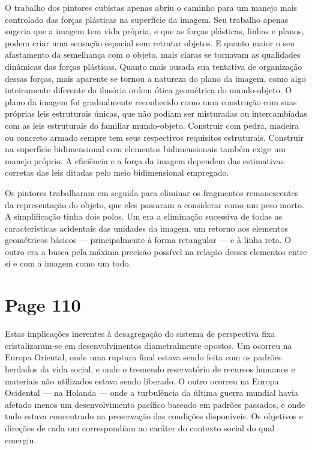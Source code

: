 \documentclass[a4paper]{article}
\begin{document}
\par

O trabalho dos pintores cubistas apenas abriu o caminho para um manejo mais controlado das forças plásticas na superfície da imagem. Seu trabalho apenas sugeria que a imagem tem vida própria, e que as forças plásticas, linhas e planos, podem criar uma sensação espacial sem retratar objetos. E quanto maior o seu afastamento da semelhança com o objeto, mais claras se tornavam as qualidades dinâmicas das forças plásticas. Quanto mais ousada sua tentativa de organização dessas forças, mais aparente se tornou a natureza do plano da imagem, como algo inteiramente diferente da ilusória ordem ótica geométrica do mundo-objeto. O plano da imagem foi gradualmente reconhecido como uma construção com suas próprias leis estruturais únicas, que não podiam ser misturadas ou intercambiadas com as leis estruturais do familiar mundo-objeto. Construir com pedra, madeira ou concreto armado sempre tem seus respectivos requisitos estruturais. Construir na superfície bidimensional com elementos bidimensionais também exige um manejo próprio. A eficiência e a força da imagem dependem das estimativas corretas das leis ditadas pelo meio bidimensional empregado.

\par

Os pintores trabalharam em seguida para eliminar os fragmentos remanescentes da representação do objeto, que eles passaram a considerar como um peso morto. A simplificação tinha dois polos. Um era a eliminação sucessiva de todas as características acidentais das unidades da imagem, um retorno aos elementos geométricos básicos --- principalmente à forma retangular --- e à linha reta. O outro era a busca pela máxima precisão possível na relação desses elementos entre si e com a imagem como um todo.
\endgroup

\vfill
{}

\newpage
\section*{Page 110}

Estas implicações inerentes à desagregação do sistema de perspectiva fixa cristalizaram-se em desenvolvimentos diametralmente opostos. Um ocorreu na Europa Oriental, onde uma ruptura final estava sendo feita com os padrões herdados da vida social, e onde o tremendo reservatório de recursos humanos e materiais não utilizados estava sendo liberado. O outro ocorreu na Europa Ocidental --- na Holanda --- onde a turbulência da última guerra mundial havia afetado menos um desenvolvimento pacífico baseado em padrões passados, e onde tudo estava concentrado na preservação das condições disponíveis. Os objetivos e direções de cada um correspondiam ao caráter do contexto social do qual emergiu.
\end{document}
